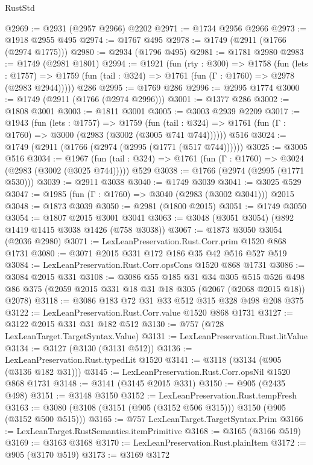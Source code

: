 \begin{lexlean}{RustStd}
\begin{coremodule}
@2969 := @2931 (@2957 @2966) @2202
@2971 := @1734 @2956 @2966
@2973 := @1918 @2955 @495
@2974 := @1767 @495
@2978 := @1749 (@2911 (@1766 (@2974 @1775)))
@2980 := @2934 (@1796 @495)
@2981 := @1781 @2980
@2983 := @1749 (@2981 @1801)
@2994 := @1921
    (fun (rty : @300) =>
    @1758
      (fun (lets : @1757) =>
      @1759 (fun (tail : @324) => @1761 (fun (Γ : @1760) => @2978 (@2983 @2944)))))
    @286
@2995 := @1769 @286
@2996 := @2995 @1774
@3000 := @1749 (@2911 (@1766 (@2974 @2996)))
@3001 := @1377 @286
@3002 := @1808 @3001
@3003 := @1811 @3001
@3005 := @3003 @2939 @2209
@3017 := @1943
    (fun (lets : @1757) =>
    @1759 (fun (tail : @324) => @1761 (fun (Γ : @1760) => @3000 (@2983 (@3002 (@3005 @741 @744))))))
    @516
@3024 := @1749 (@2911 (@1766 (@2974 (@2995 (@1771 (@517 @744))))))
@3025 := @3005 @516
@3034 := @1967
    (fun (tail : @324) => @1761 (fun (Γ : @1760) => @3024 (@2983 (@3002 (@3025 @744)))))
    @529
@3038 := @1766 (@2974 (@2995 (@1771 @530)))
@3039 := @2911 @3038
@3040 := @1749 @3039
@3041 := @3025 @529
@3047 := @1985 (fun (Γ : @1760) => @3040 (@2983 (@3002 @3041))) @2015
@3048 := @1873 @3039
@3050 := @2981 (@1800 @2015)
@3051 := @1749 @3050
@3054 := @1807 @2015 @3001 @3041
@3063 := @3048 (@3051 @3054) (@892 @1419 @1415 @3038 @1426 (@758 @3038))
@3067 := @1873 @3050 @3054 (@2036 @2980)
@3071 := LexLeanPreservation.Rust.Corr.prim @1520 @868 @1731
@3080 := @3071 @2015 @331 @172 @186 @35 @42 @516 @527 @519
@3084 := LexLeanPreservation.Rust.Corr.opsCons @1520 @868 @1731
@3086 := @3084 @2015 @331
@3108 := @3086
    @55
    @185
    @31
    @34
    @305
    @515
    @526
    @498
    @86
    @375
    (@2059 @2015 @331 @18 @31 @18 @305 (@2067 (@2068 @2015 @18)) @2078)
@3118 := @3086 @183 @72 @31 @33 @512 @315 @328 @498 @208 @375
@3122 := LexLeanPreservation.Rust.Corr.value @1520 @868 @1731
@3127 := @3122 @2015 @331 @31 @182 @512
@3130 := @757 (@728 LexLeanTarget.TargetSyntax.Value)
@3131 := LexLeanPreservation.Rust.litValue
@3134 := @3127 (@3130 (@3131 @512))
@3136 := LexLeanPreservation.Rust.typedLit @1520
@3141 := @3118 (@3134 (@905 (@3136 @182 @31)))
@3145 := LexLeanPreservation.Rust.Corr.opsNil @1520 @868 @1731
@3148 := @3141 (@3145 @2015 @331)
@3150 := @905 (@2435 @498)
@3151 := @3148 @3150
@3152 := LexLeanPreservation.Rust.tempFresh
@3163 := @3080 (@3108 (@3151 (@905 (@3152 @506 @315))) @3150 (@905 (@3152 @500 @515)))
@3165 := @757 LexLeanTarget.TargetSyntax.Prim
@3166 := LexLeanTarget.RustSemantics.itemPrimitive
@3168 := @3165 (@3166 @519)
@3169 := @3163 @3168
@3170 := LexLeanPreservation.Rust.plainItem
@3172 := @905 (@3170 @519)
@3173 := @3169 @3172

\end{coremodule}
\end{lexlean}
